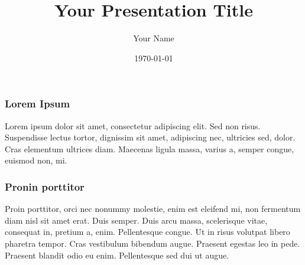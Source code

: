 \documentclass{beamer}
\title{Your Presentation Title}
\author{Your Name}
\date{\today}
\begin{document}
\frame{\titlepage}

\begin{frame}
\frametitle{Lorem Ipsum}
Lorem ipsum dolor sit amet, 
consectetur adipiscing elit. 
Sed non risus. Suspendisse lectus tortor, 
dignissim sit amet, adipiscing nec, 
ultricies sed, dolor. Cras elementum 
ultrices diam. Maecenas ligula massa, 
varius a, semper congue, euismod non, mi. 
\end{frame}

\begin{frame}
\frametitle{Pronin porttitor}
Proin porttitor, orci nec nonummy molestie, 
enim est eleifend mi, non fermentum diam nisl 
sit amet erat. Duis semper. Duis arcu massa, 
scelerisque vitae, consequat in, pretium a, enim.
Pellentesque congue. Ut in risus volutpat libero 
pharetra tempor. Cras vestibulum bibendum augue.
Praesent egestas leo in pede. Praesent blandit
odio eu enim. Pellentesque sed dui ut augue.
\end{frame}
\end{document}
